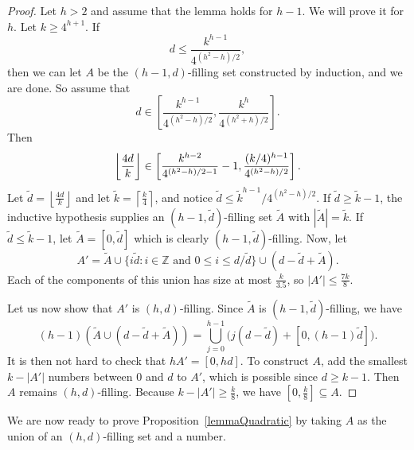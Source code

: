 \documentclass{daj}
\theoremstyle{definition}
\theoremstyle{remark}
\numberwithin{equation}{section}
\numberwithin{theorem}{section}
\newcommand{\Z}{\mathbb{Z}}
\DeclarePairedDelimiter{\floor}{\lfloor}{\rfloor}
\begin{document}
\begin{proof}
    Let $h>2$ and assume that the lemma holds for $h-1$. We will prove it for $h$. Let $k \geq 4^{h+1}$. If \[d \leq \frac{k^{h-1}}{4^{(h^2-h)/2}},\] then we can let $A$ be the $(h-1,d)$-filling set constructed by induction, and we are done. So assume that \[d \in \left[\frac{k^{h-1}}{4^{(h^2-h)/2}},\frac{k^{h}}{4^{(h^2+h)/2}}\right].\]
    Then \[\floor*{\frac{4d}{k}} \in \left[\frac{k^{h-2}}{4^{(h^2-h)/2-1}}-1,\frac{(k/4)^{h-1}}{4^{(h^2-h)/2}}\right].\] 
    Let $\tilde{d} =\left\lfloor\frac{4d}{k}\right\rfloor$ and let $\tilde{k} = \left\lceil \frac{k}{4} \right\rceil$, and notice $\tilde{d} \leq \tilde{k}^{h-1}/4^{(h^2-h)/2}$. If $\tilde{d} \geq \tilde{k}-1$, the inductive hypothesis supplies an $(h-1,\tilde{d})$-filling set $\tilde{A}$ with $|\tilde{A}| = \tilde{k}$. If $\tilde{d} \leq \tilde{k}-1$, let $\tilde{A} = [0,\tilde{d}]$ which is clearly $(h-1,\tilde{d})$-filling. Now, let 
    \[A' = \tilde{A} \cup \{i\tilde{d}: i \in \Z \text{ and }0 \leq i \leq d/\tilde{d}\} \cup (d-\tilde{d}+\tilde{A}).\] 
    Each of the components of this union has size at most $\frac{k}{3.5}$, so $|A'| \leq \frac{7k}{8}$. 

    Let us now show that $A'$ is $(h,d)$-filling. Since $\tilde{A}$ is $(h-1,\tilde{d})$-filling, we have \[(h-1)\left(\tilde{A} \cup  (d-\tilde{d}+\tilde{A})\right) = \bigcup_{j=0}^{h-1} \Big(j(d-\tilde{d}) + [0,(h-1)\tilde{d}]\Big).\] It is then not hard to check that $hA' = [0,hd]$. To construct $A$, add the smallest $k-|A'|$ numbers between $0$ and $d$ to $A'$, which is possible since $d \geq k-1$. Then $A$ remains $(h,d)$-filling. Because $k-|A'| \geq \frac{k}{8}$, we have  $[0,\frac{k}{8}] \subseteq A$.
\end{proof}

We are now ready to prove Proposition~\ref{lemmaQuadratic} by taking $A$ as the union of an $(h,d)$-filling set and a number.
\end{document}
